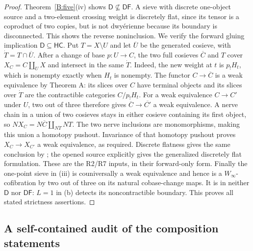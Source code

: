 \documentclass[11pt,a4paper]{article}
\theoremstyle{definition}
\theoremstyle{remark}
\newcommand{\Winfty}{W_\infty}
\begin{document}
\begin{proof}
Theorem~\ref{B:five}(iv) shows $\mathsf D\nsubseteq\mathsf{DF}$. A sieve with discrete one-object source and a two-element crossing weight is discretely flat, since its tensor is a coproduct of two copies, but is not dwy\'erienne because its boundary is disconnected. This shows the reverse noninclusion. We verify the forward gluing implication $\mathsf D\subseteq\mathsf{HC}$. Put $T=X\setminus U$ and let $\overline U$ be the generated cosieve, with $\dot T=T\cap\overline U$. After a change of base $p:U\to C$, the two full cosieves $\overline C$ and $T$ cover $X_C=C\amalg_U X$ and intersect in the same $\dot T$. Indeed, the new weight at $t$ is $p_!H_t$, which is nonempty exactly when $H_t$ is nonempty. The functor $C\to\overline C$ is a weak equivalence by Theorem A: its slices over $C$ have terminal objects and its slices over $\dot T$ are the contractible categories $C/p_!H_t$. For a weak equivalence $C\to C'$ under $U$, two out of three therefore gives $\overline C\to\overline{C'}$ a weak equivalence. A nerve chain in a union of two cosieves stays in either cosieve containing its first object, so $NX_C=N\overline C\amalg_{N\dot T}NT$. The two nerve inclusions are monomorphisms, making this union a homotopy pushout. Invariance of that homotopy pushout proves $X_C\to X_{C'}$ a weak equivalence, as required. Discrete flatness gives the same conclusion by \citet[Theorems 1.5--1.6]{HORR2024}; the opened source explicitly gives the generalized discretely flat formulation. These are the R2/R7 inputs, in their forward-only form. Finally the one-point sieve in (iii) is couniversally a weak equivalence and hence is a $\Winfty$-cofibration by two out of three on its natural cobase-change maps. It is in neither $\mathsf D$ nor $\mathsf{DF}$: $L=1$ in (b) detects its noncontractible boundary. This proves all stated strictness assertions.
\end{proof}



\subsection{A self-contained audit of the composition statements}
\end{document}

